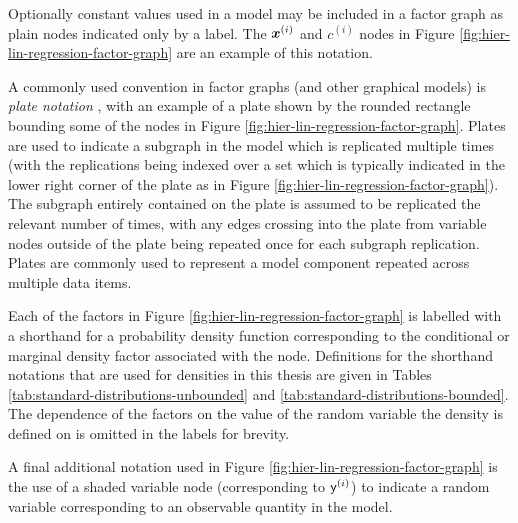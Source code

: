 Optionally constant values used in a model may be included in a factor graph as plain nodes indicated only by a label. The $\boldsymbol{x}^{(i)}$ and $c^{(i)}$ nodes in Figure \ref{fig:hier-lin-regression-factor-graph} are an example of this notation.

A commonly used convention in factor graphs (and other graphical models) is \emph{plate notation} \citep{buntine1994operations}, with an example of a plate shown by the rounded rectangle bounding some of the nodes in Figure \ref{fig:hier-lin-regression-factor-graph}. Plates are used to indicate a subgraph in the model which is replicated multiple times (with the replications being indexed over a set which is typically indicated in the lower right corner of the plate as in Figure \ref{fig:hier-lin-regression-factor-graph}). The subgraph entirely contained on the plate is assumed to be replicated the relevant number of times, with any edges crossing into the plate from variable nodes outside of the plate being repeated once for each subgraph replication. Plates are commonly used to represent a model component repeated across multiple data items.

Each of the factors in Figure \ref{fig:hier-lin-regression-factor-graph} is labelled with a shorthand for a probability density function corresponding to the conditional or marginal density factor associated with the node. Definitions for the shorthand notations that are used for densities in this thesis are given in Tables \ref{tab:standard-distributions-unbounded} and \ref{tab:standard-distributions-bounded}. The dependence of the factors on the value of the random variable the density is defined on is omitted in the labels for brevity.

A final additional notation used in Figure \ref{fig:hier-lin-regression-factor-graph} is the use of a shaded variable node (corresponding to $\mathsf{y}^{(i)}$) to indicate a random variable corresponding to an observable quantity in the model. %


